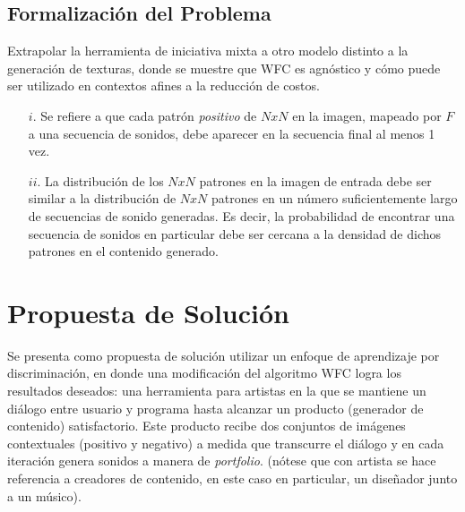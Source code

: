 \documentclass[a4paper, 10pt]{article}
\begin{document}
	\subsection{Formalización del Problema}
	Extrapolar la herramienta de iniciativa mixta a otro modelo distinto
	a la generación de texturas, donde se muestre que WFC es agnóstico y
	cómo puede ser utilizado en contextos afines a la reducción de costos.
	
	\begin{itemize}
		\item[$i$.] Se refiere a que cada patrón \textit{positivo} de $NxN$ en la imagen,
			mapeado por $F$ a una secuencia de sonidos, debe aparecer en la secuencia final
			al menos 1 vez.
		\item[$ii$.] La distribución de los $NxN$ patrones en la imagen de entrada debe 
			ser similar a la distribución de $NxN$ patrones en un número suficientemente largo
			de secuencias de sonido generadas. Es decir, la probabilidad de encontrar
			una secuencia de sonidos en particular debe ser cercana a la densidad de dichos
			patrones en el contenido generado.  
	\end{itemize}
	
	\section{Propuesta de Solución}
	Se presenta como propuesta de solución utilizar un enfoque de aprendizaje por discriminación,
	en donde una modificación del algoritmo WFC logra los resultados deseados: una herramienta
	para artistas en la que se mantiene un diálogo entre usuario y programa hasta alcanzar
	un producto (generador de contenido) satisfactorio. Este producto recibe dos conjuntos de
	imágenes contextuales (positivo y negativo) a medida que transcurre el diálogo y en cada iteración
	genera sonidos a manera de \textit{portfolio}.
	(nótese que con artista se hace referencia a creadores de contenido, en este
	caso en particular, un diseñador junto a un músico).
\end{document}
